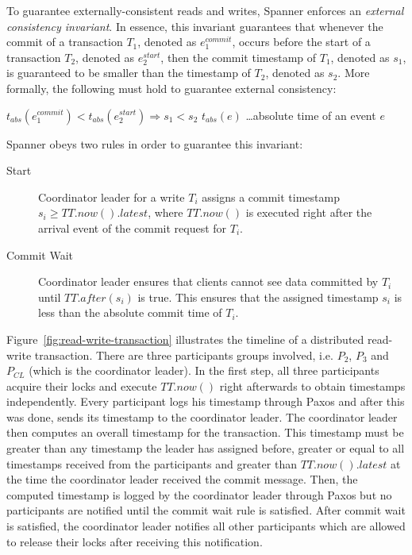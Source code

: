 \documentclass[onecolumn, a4paper, 10pt]{article}
\begin{document}
To guarantee externally-consistent reads and writes, Spanner enforces an
\emph{external consistency invariant}. In essence, this invariant guarantees that
whenever the commit of a transaction $T_1$, denoted as $e_1^{commit}$, occurs
before the start of a transaction $T_2$, denoted as $e_2^{start}$, then the commit
timestamp of $T_1$, denoted as $s_1$, is guaranteed to be smaller than the
timestamp of $T_2$, denoted as $s_2$. More formally, the following must hold to
guarantee external consistency:
\begin{center}
$t_{abs}\left(e_1^{commit}\right) < t_{abs}\left(e_2^{start}\right) \Rightarrow s_1 < s_2$
\qquad\qquad $t_{abs}(e)$ \ldots absolute time of an event $e$
\end{center}

\noindent
Spanner obeys two rules in order to guarantee this invariant:
\begin{description}
  \item[Start] Coordinator leader for a write $T_i$ assigns a commit timestamp
    $s_i \geq TT.now().latest$, where $TT.now()$ is executed right after the
    arrival event of the commit request for $T_i$.
  \item[Commit Wait] Coordinator leader ensures that clients cannot see data
    committed by $T_i$ until $TT.after\left(s_i\right)$ is true. This ensures
    that the assigned timestamp $s_i$ is less than the absolute commit time of
    $T_i$.~\cite{Corbett:2012}
\end{description}

Figure~\ref{fig:read-write-transaction} illustrates the timeline of a distributed
read-write transaction. There are three participants groups involved, i.e. $P_2$,
$P_3$ and $P_{CL}$ (which is the coordinator leader). In the first step, all three
participants acquire their locks and execute $TT.now()$ right afterwards to obtain
timestamps independently. Every participant logs his timestamp through Paxos and
after this was done, sends its timestamp to the coordinator leader. The
coordinator leader then computes an overall timestamp for the transaction. This
timestamp must be greater than any timestamp the leader has assigned before,
greater or equal to all timestamps received from the participants and greater than
$TT.now().latest$ at the time the coordinator leader received the commit message.
Then, the computed timestamp is logged by the coordinator leader through Paxos
but no participants are notified until the commit wait rule is satisfied. After
commit wait is satisfied, the coordinator leader notifies all other participants
which are allowed to release their locks after receiving this notification.
\end{document}
